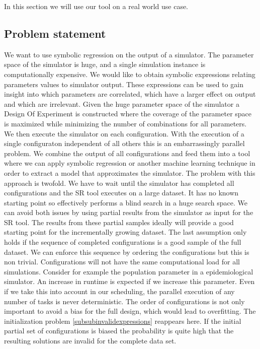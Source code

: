 In this section we will use our tool on a real world use case. %
\subsection{Problem statement}
We want to use symbolic regression on the output of a simulator. The parameter space of the simulator is huge, and a single simulation instance is computationally expensive. We would like to obtain symbolic expressions relating parameters values to simulator output. These expressions can be used to gain insight into which parameters are correlated, which have a larger effect on output and which are irrelevant. 
Given the huge parameter space of the simulator a Design Of Experiment is constructed where the coverage of the parameter space is maximized while minimizing the number of combinations for all parameters. %
We then execute the simulator on each configuration. With the execution of a single configuraton independent of all others this is an embarrassingly parallel problem. We combine the output of all configurations and feed them into a tool where we can apply symbolic regression or another machine learning technique in order to extract a model that approximates the simulator. The problem with this approach is twofold. We have to wait until the simulator has completed all configurations and the SR tool executes on a large dataset. It has no known starting point so effectively performs a blind search in a huge search space. We can avoid both issues by using partial results from the simulator as input for the SR tool. The results from these partial samples ideally will provide a good starting point for the incrementally growing dataset. The last assumption only holds if the sequence of completed configurations is a good sample of the full dataset. We can enforce this sequence by ordering the configurations but this is non trivial. Configurations will not have the same computational load for all simulations. Consider for example the population parameter in a epidemiological simulator. An increase in runtime is expected if we increase this parameter. Even if we take this into account in our scheduling, the parallel execution of any number of tasks is never deterministic. The order of configurations is not only important to avoid a bias for the full design, which would lead to overfitting. The initialization problem \ref{subsubinvalidexpressions} reappears here. If the initial partial set of configurations is biased the probability is quite high that the resulting solutions are invalid for the complete data set. 
